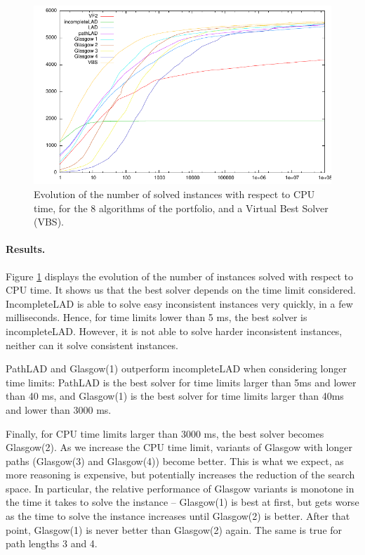 \documentclass{llncs}
\begin{document}
\begin{figure}[t]
\includegraphics[width=\textwidth]{courbe.pdf}
\caption{Evolution of the number of solved instances with respect to CPU time, for the 8 algorithms of the portfolio, and a Virtual Best Solver (VBS).\label{expTime}}
\end{figure}

\paragraph{Results.}Figure \ref{expTime} displays the evolution of the number of instances solved with respect to CPU time. It shows us that the best solver depends on the time limit
considered. IncompleteLAD is able to solve easy inconsistent instances very quickly, in a few milliseconds. Hence, for time limits lower than 5 ms, the best solver is incompleteLAD. However, it is not able to solve harder inconsistent instances, neither can it solve consistent instances. 

PathLAD and Glasgow(1) outperform incompleteLAD when considering longer time limits: PathLAD is the best solver for time limits larger than 5ms and lower than 40 ms, and Glasgow(1) is the best solver for time limits larger than 40ms and lower than 3000 ms.

Finally, for CPU time limits larger than 3000 ms, the best solver becomes Glasgow(2).
As we increase the CPU time limit, variants of Glasgow with longer paths (Glasgow(3) and Glasgow(4)) become better. This is what we expect, as more reasoning is expensive, but potentially increases the reduction of the search space. In particular, the relative performance of Glasgow variants is monotone in the time it takes to solve the instance – Glasgow(1) is best at first, but gets worse as the time to solve the instance increases until Glasgow(2) is better. After that point, Glasgow(1) is never better than Glasgow(2) again. The same is true for path lengths 3 and 4.
\end{document}
